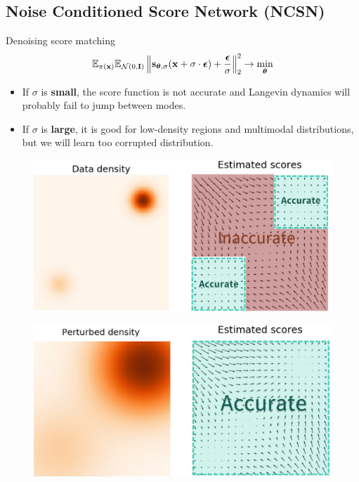 \subsection{Noise Conditioned Score Network (NCSN)}
\begin{frame}{Denoising score matching}
	\vspace{-0.5cm}
	\[
		\mathbb{E}_{\pi(\mathbf{x})} \mathbb{E}_{\mathcal{N}(0, \mathbf{I})}\left\| \mathbf{s}_{\boldsymbol{\theta}, \sigma}(\mathbf{x} + \sigma \cdot \boldsymbol{\epsilon}) + \frac{\boldsymbol{\epsilon}}{\sigma} \right\|^2_2 \rightarrow \min_{\boldsymbol{\theta}}
	\]
	\begin{minipage}{0.5\linewidth}
		\begin{itemize}
			\item If $\sigma$ is \textbf{small}, the score function is not accurate and Langevin dynamics will probably fail to jump between modes.
			\item If $\sigma$ is \textbf{large}, it is good for low-density regions and  multimodal distributions, but we will learn too corrupted distribution.
		\end{itemize}
	\end{minipage}%
	\begin{minipage}{0.5\linewidth}
		\begin{figure}
			\includegraphics[width=\linewidth]{figs/pitfalls}
		\end{figure}
		\vspace{-0.3cm}
		\begin{figure}
			\includegraphics[width=\linewidth]{figs/single_noise}
		\end{figure}
	\end{minipage}
\end{frame}
